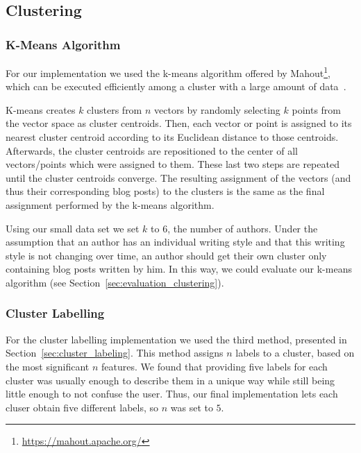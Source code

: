 \subsection{Clustering}
\label{sec:impl_clustering}


\subsubsection{K-Means Algorithm}
\label{sec:impl_k-means}
For our implementation we used the k-means algorithm offered by Mahout\footnote{\url{https://mahout.apache.org/}}, which can be executed efficiently among a cluster with a large amount of data~\cite{esteves2011k}.


K-means creates $k$ clusters from $n$ vectors by randomly selecting $k$ points from the vector space as cluster centroids.
Then, each vector or point is assigned to its nearest cluster centroid according to its Euclidean distance to those centroids.
Afterwards, the cluster centroids are repositioned to the center of all vectors/points which were assigned to them.
These last two steps are repeated until the cluster centroids converge.
The resulting assignment of the vectors (and thus their corresponding blog posts) to the clusters is the same as the final assignment performed by the k-means algorithm.


Using our small data set we set $k$ to $6$, the number of authors.
Under the assumption that an author has an individual writing style and that this writing style is not changing over time, an author should get their own cluster only containing blog posts written by him.
In this way, we could evaluate our k-means algorithm (see Section~\ref{sec:evaluation_clustering}).


\subsubsection{Cluster Labelling}
\label{sec:impl_cluster_labeling}
For the cluster labelling implementation we used the third method, presented in Section~\ref{sec:cluster_labeling}.
This method assigns $n$ labels to a cluster, based on the most significant $n$ features.
We found that providing five labels for each cluster was usually enough to describe them in a unique way while still being little enough to not confuse the user.
Thus, our final implementation lets each cluser obtain five different labels, so $n$ was set to $5$.